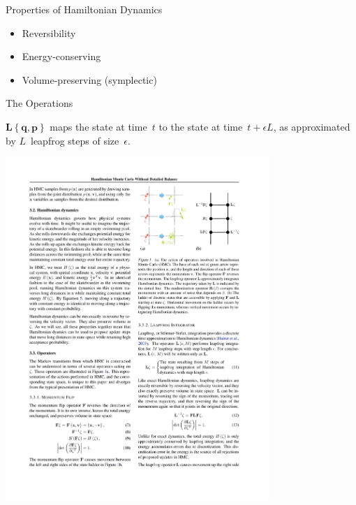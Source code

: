 \documentclass{beamer}
\renewcommand{\vec}[1]{\ensuremath{\mathbf{#1}}}
\newcommand{\op}[1]{\ensuremath{\mathbf{#1}}}
\begin{document}
    \begin{frame}{Properties of Hamiltonian Dynamics}
        \begin{itemize}
            \item Reversibility
            \item Energy-conserving
            \item Volume-preserving (symplectic)
        \end{itemize}
    \end{frame}

    \begin{frame}{The Operations}

        \begin{definition}
            $\op{L}\left\{\vec{q},\vec{p}\right\}$ maps the state at time~$t$ to the state at time~$t + \epsilon L$, as approximated by $L$~leapfrog steps of size~$\epsilon$.
        \end{definition}

        \vfill

        \centering
        \includegraphics[width=0.75\textwidth]{L.pdf}

    \end{frame}
\end{document}

